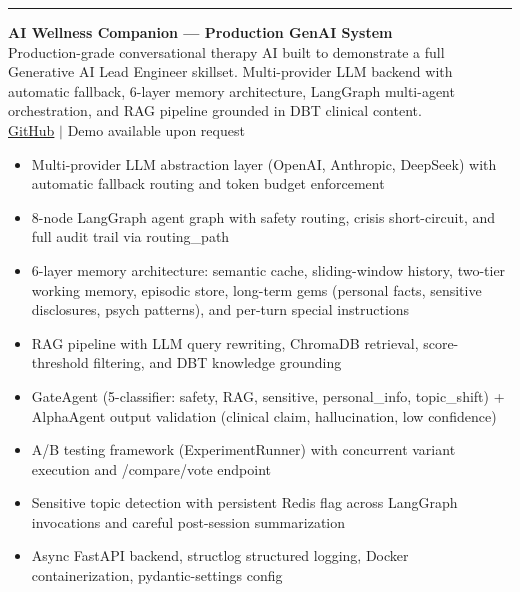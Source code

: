 \documentclass[10pt]{article}
\newcommand{\cvsection}[1]{
    \vspace{0.04in}
    \noindent{\large \textbf{#1}}
    \vspace{0.01in}
    \hrule
    \vspace{0.03in}
}
\begin{document}
\cvsection{Projects}
\noindent\textbf{AI Wellness Companion — Production GenAI System}\\
Production-grade conversational therapy AI built to demonstrate a full Generative AI Lead Engineer skillset. Multi-provider LLM backend with automatic fallback, 6-layer memory architecture, LangGraph multi-agent orchestration, and RAG pipeline grounded in DBT clinical content.\\
\href{https://github.com/NatanelRichey}{GitHub} $|$ Demo available upon request
\vspace{0.3em}\begin{itemize}[topsep=0pt, itemsep=2pt, parsep=0pt, partopsep=0pt]
    \item Multi-provider LLM abstraction layer (OpenAI, Anthropic, DeepSeek) with automatic fallback routing and token budget enforcement
    \item 8-node LangGraph agent graph with safety routing, crisis short-circuit, and full audit trail via routing\_path
    \item 6-layer memory architecture: semantic cache, sliding-window history, two-tier working memory, episodic store, long-term gems (personal facts, sensitive disclosures, psych patterns), and per-turn special instructions
    \item RAG pipeline with LLM query rewriting, ChromaDB retrieval, score-threshold filtering, and DBT knowledge grounding
    \item GateAgent (5-classifier: safety, RAG, sensitive, personal\_info, topic\_shift) + AlphaAgent output validation (clinical claim, hallucination, low confidence)
    \item A/B testing framework (ExperimentRunner) with concurrent variant execution and /compare/vote endpoint
    \item Sensitive topic detection with persistent Redis flag across LangGraph invocations and careful post-session summarization
    \item Async FastAPI backend, structlog structured logging, Docker containerization, pydantic-settings config
\end{itemize}
\vspace{0.5em}
\end{document}
